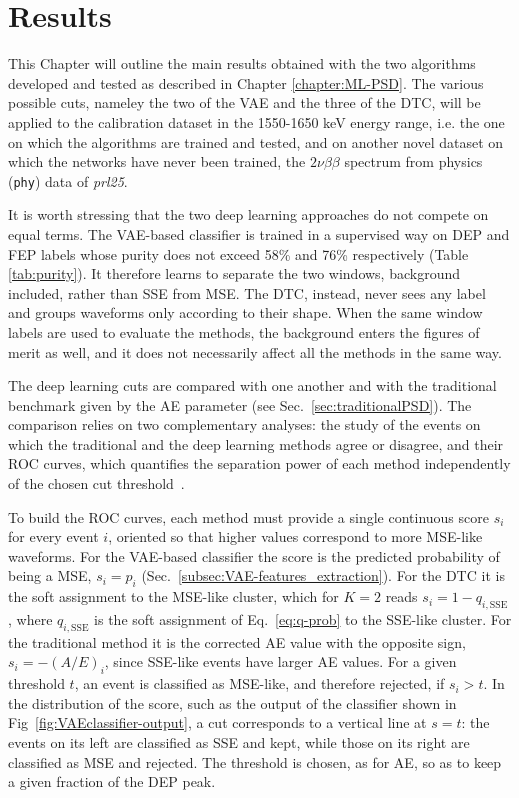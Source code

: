 \chapter{Results}
\label{chapter:results}

This Chapter will outline the main results obtained with the two algorithms developed and tested as described in Chapter \ref{chapter:ML-PSD}. The various possible cuts, nameley the two of the \ac{VAE} and the three of the \ac{DTC}, will be applied to the calibration dataset in the 1550-1650 keV energy range, i.e. the one on which the algorithms are trained and tested, and on another novel dataset on which the networks have never been trained, the $2\nu\beta\beta$ spectrum from physics (\texttt{phy}) data of \textit{prl25}.

It is worth stressing that the two deep learning approaches do not compete on equal terms. The \ac{VAE}-based classifier is trained in a supervised way on \ac{DEP} and \ac{FEP} labels whose purity does not exceed 58\% and 76\% respectively (Table \ref{tab:purity}). It therefore learns to separate the two windows, background included, rather than \ac{SSE} from \ac{MSE}. The \ac{DTC}, instead, never sees any label and groups waveforms only according to their shape. When the same window labels are used to evaluate the methods, the background enters the figures of merit as well, and it does not necessarily affect all the methods in the same way. 

The deep learning cuts are compared with one another and with the traditional benchmark given by the \ac{AE} parameter (see Sec.~\ref{sec:traditionalPSD}). The comparison relies on two complementary analyses: the study of the events on which the traditional and the deep learning methods agree or disagree, and their \ac{ROC} curves, which quantifies the separation power of each method independently of the chosen cut threshold~\cite{ROCanalysis}.

To build the \ac{ROC} curves, each method must provide a single continuous score $s_i$ for every event $i$, oriented so that higher values correspond to more \ac{MSE}-like waveforms. For the \ac{VAE}-based classifier the score is the predicted probability of being a \ac{MSE}, $s_i = p_i$ (Sec.~\ref{subsec:VAE-features_extraction}). For the \ac{DTC} it is the soft assignment to the \ac{MSE}-like cluster, which for $K = 2$ reads $s_i = 1 - q_{i,\mathrm{SSE}}$, where $q_{i,\mathrm{SSE}}$ is the soft assignment of Eq.~\ref{eq:q-prob} to the \ac{SSE}-like cluster. For the traditional method it is the corrected \ac{AE} value with the opposite sign, $s_i = -(A/E)_i$, since \ac{SSE}-like events have larger \ac{AE} values. For a given threshold $t$, an event is classified as \ac{MSE}-like, and therefore rejected, if $s_i > t$. In the distribution of the score, such as the output of the classifier shown in Fig~\ref{fig:VAEclassifier-output}, a cut corresponds to a vertical line at $s = t$: the events on its left are classified as \ac{SSE} and kept, while those on its right are classified as \ac{MSE} and rejected. The threshold is chosen, as for \ac{AE}, so as to keep a given fraction of the \ac{DEP} peak.



